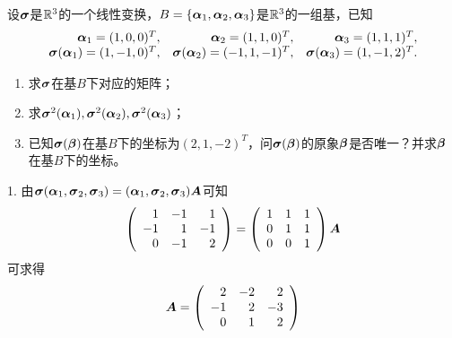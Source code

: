 \begin{frame}
  \begin{li}
    设$\boldsymbol{\sigma}$是$\mathbb R^3$的一个线性变换，$B=\{\boldsymbol{\alpha}_1,\boldsymbol{\alpha}_2,\boldsymbol{\alpha}_3\}$是$\mathbb R^3$的一组基，已知
    $$
    \begin{array}{rrr}
      \boldsymbol{\alpha}_1=(1,0,0)^T,&\boldsymbol{\alpha}_2=(1,1,0)^T,&\boldsymbol{\alpha}_3=(1,1,1)^T,\\
      \boldsymbol{\sigma}(\boldsymbol{\alpha}_1)=(1,-1,0)^T,&\boldsymbol{\sigma}(\boldsymbol{\alpha}_2)=(-1,1,-1)^T,&\boldsymbol{\sigma}(\boldsymbol{\alpha}_3)=(1,-1,2)^T.
    \end{array}
    $$
    \begin{enumerate}
      \item 求$\boldsymbol{\sigma}$在基$B$下对应的矩阵；
      \item 求$\boldsymbol{\sigma}^2(\boldsymbol{\alpha}_1),\boldsymbol{\sigma}^2(\boldsymbol{\alpha}_2),\boldsymbol{\sigma}^2(\boldsymbol{\alpha}_3)$；
      \item 已知$\boldsymbol{\sigma}(\boldsymbol{\beta})$在基$B$下的坐标为$(2,1,-2)^T$，问$\boldsymbol{\sigma}(\boldsymbol{\beta})$的原象$\boldsymbol{\beta}$是否唯一？并求$\boldsymbol{\beta}$在基$B$下的坐标。
    \end{enumerate}
  \end{li}

\end{frame}

\begin{frame}
  \begin{jie}
    1. 由$\boldsymbol{\sigma}(\boldsymbol{\alpha}_1,\boldsymbol{\sigma}_2,\boldsymbol{\sigma}_3)=(\boldsymbol{\alpha}_1,\boldsymbol{\sigma}_2,\boldsymbol{\sigma}_3)\boldsymbol{A}$可知
    $$
    \left(
      \begin{array}{rrr}
        1&-1&1\\
        -1&1&-1\\
        0&-1&2
      \end{array}
    \right)=\left(
      \begin{array}{rrr}
        1&1&1\\
        0&1&1\\
        0&0&1
      \end{array}
    \right)\boldsymbol{A}
    $$
    可求得
    $$
    \boldsymbol{A}=\left(
      \begin{array}{rrr}
        2&-2&2\\
        -1&2&-3\\
        0&1&2
      \end{array}
    \right)
    $$
  \end{jie}
\end{frame}

